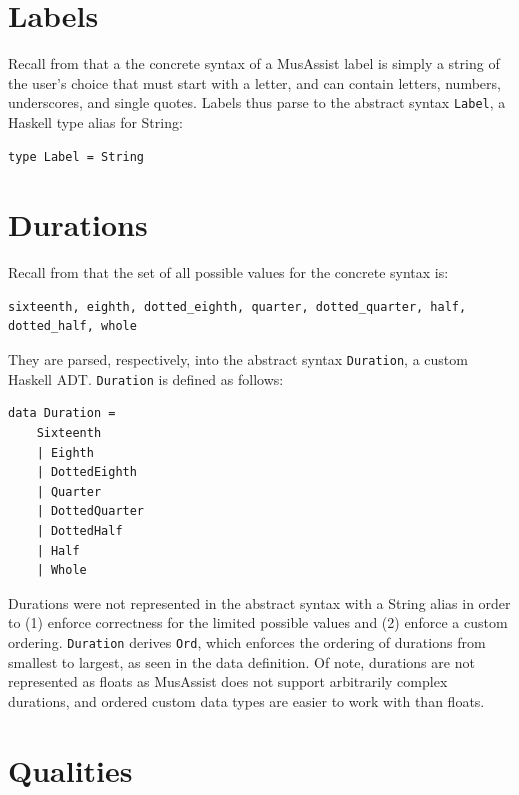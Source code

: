 \documentclass{report}
\newcommand\param[1]{\textttu{<#1>}}
\begin{document}
\section{Labels}
Recall from  that a the concrete syntax of a MusAssist label is simply a string of the user's choice that must start with a letter, and can contain letters, numbers, underscores, and single quotes. Labels thus parse to the abstract syntax \verb.Label., a Haskell type alias for String:

\begin{verbatim}
type Label = String
\end{verbatim}

\section{Durations}
Recall from  that the set of all possible values for the concrete syntax \param{DURATION} is:

\begin{verbatim}
sixteenth, eighth, dotted_eighth, quarter, dotted_quarter, half, dotted_half, whole
\end{verbatim}

They are parsed, respectively, into the abstract syntax \verb.Duration., a custom Haskell ADT. \verb.Duration. is defined as follows:

\begin{verbatim}
data Duration = 
    Sixteenth
    | Eighth 
    | DottedEighth 
    | Quarter 
    | DottedQuarter 
    | DottedHalf 
    | Half 
    | Whole 
\end{verbatim}

Durations were not represented in the abstract syntax with a String alias in order to (1) enforce correctness for the limited possible values and (2) enforce a custom ordering. \verb.Duration. derives \verb.Ord., which enforces the ordering of durations from smallest to largest, as seen in the data definition. Of note, durations are not represented as floats as MusAssist does not support arbitrarily complex durations, and ordered custom data types are easier to work with than floats.

\section{Qualities}
\end{document}
